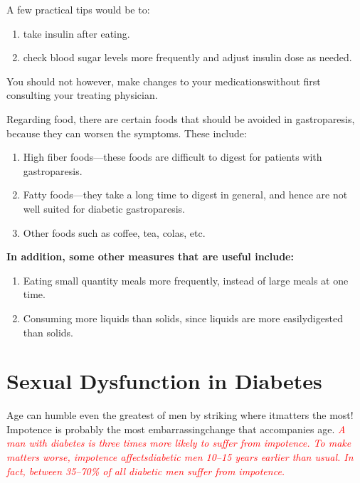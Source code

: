 \noindent A few practical tips would be to:

\begin{enumerate}[•]
\itemsep=0pt
\item take insulin after eating.
\item check blood sugar levels more frequently and adjust insulin dose as needed.
\end{enumerate}

You should not however, make changes to your medications\break without first consulting your treating physician.

Regarding food, there are certain foods that should be avoided in gastroparesis, because they can worsen the symptoms. These include:

\begin{enumerate}[•]
\itemsep=0pt
\item High fiber foods—these foods are difficult to digest for patients with gastroparesis.
\item Fatty foods—they take a long time to digest in general, and hence are not well suited for diabetic gastroparesis.
\item Other foods such as coffee, tea, colas, etc.
\end{enumerate}

\noindent\textbf{In addition, some other measures that are useful include:}

\begin{enumerate}[•]
\itemsep=0pt
\item Eating small quantity meals more frequently, instead of large meals at one time.
\item Consuming more liquids than solids, since liquids are more easily\break digested than solids.
\end{enumerate}


\chapter{Sexual Dysfunction in Diabetes}\label{chap21}


Age can humble even the greatest of men by striking where it\break matters the most! Impotence is probably the most embarrassing\break change that accompanies age. \textcolor{red}{\textit{A man with diabetes is three times more likely to suffer from impotence. To make matters worse, impotence affects\break diabetic men 10–15 years earlier than usual. In fact, between 35–70\% of all diabetic men suffer from impotence.}}

